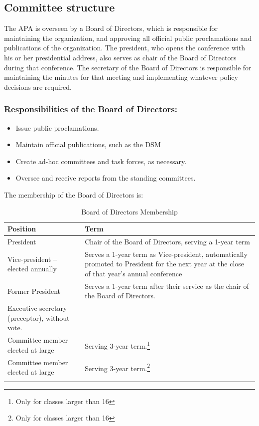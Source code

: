 \subsection{Committee structure}
\label{committeestructure}

The APA is overseen by a Board of Directors, which is responsible for maintaining the organization, and approving all official public proclamations and publications of the organization. The president, who opens the conference with his or her presidential address, also serves as chair of the Board of Directors during that conference. The secretary of the Board of Directors is responsible for maintaining the minutes for that meeting and implementing whatever policy decisions are required.

\subsubsection{Responsibilities of the Board of Directors:}
\label{responsibilitiesoftheboardofdirectors:}

\begin{itemize}
\item Issue public proclamations.

\item Maintain official publications, such as the DSM

\item Create ad-hoc committees and task forces, as necessary.

\item Oversee and receive reports from the standing committees.

\end{itemize}

The membership of the Board of Directors is:

 \begin{longtable}[!t]{ | p{3cm} |  p{10cm} | }
\hline
\textbf{Position}&\textbf{Term} \\ \hline
President&Chair of the Board of Directors, serving a 1-year term \\
Vice-president – elected annually&Serves a 1-year term as Vice-president, automatically promoted to President for the next year at the close of that year's annual conference \\
Former President&Serves a 1-year term after their service as the chair of the Board of Directors. \\
Executive secretary (preceptor), without vote.& \\

Committee member elected at large&Serving 3-year term.\footnote{Only for classes larger than 16} \\
Committee member elected at large&Serving 3-year term.\footnote{Only for classes larger than 16} \\ \hline
\caption{Board of Directors Membership}
\label{table: boardMembership}
\end{longtable}

